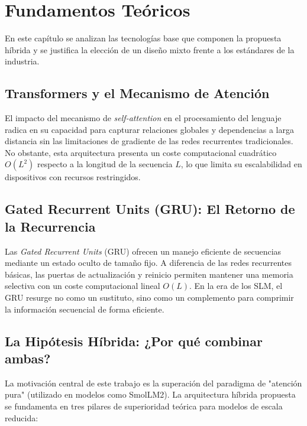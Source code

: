 \section{Fundamentos Teóricos}
\label{sec:fundamentos}

En este capítulo se analizan las tecnologías base que componen la propuesta híbrida y se justifica la elección de un diseño mixto frente a los estándares de la industria.

\subsection{Transformers y el Mecanismo de Atención}
El impacto del mecanismo de \textit{self-attention} en el procesamiento del lenguaje radica en su capacidad para capturar relaciones globales y dependencias a larga distancia sin las limitaciones de gradiente de las redes recurrentes tradicionales. No obstante, esta arquitectura presenta un coste computacional cuadrático $O(L^2)$ respecto a la longitud de la secuencia $L$, lo que limita su escalabilidad en dispositivos con recursos restringidos.

\subsection{Gated Recurrent Units (GRU): El Retorno de la Recurrencia}
Las \textit{Gated Recurrent Units} (GRU) ofrecen un manejo eficiente de secuencias mediante un estado oculto de tamaño fijo. A diferencia de las redes recurrentes básicas, las puertas de actualización y reinicio permiten mantener una memoria selectiva con un coste computacional lineal $O(L)$. En la era de los SLM, el GRU resurge no como un sustituto, sino como un complemento para comprimir la información secuencial de forma eficiente.

\subsection{La Hipótesis Híbrida: ¿Por qué combinar ambas?}
La motivación central de este trabajo es la superación del paradigma de "atención pura" (utilizado en modelos como SmolLM2). La arquitectura híbrida propuesta se fundamenta en tres pilares de superioridad teórica para modelos de escala reducida:

